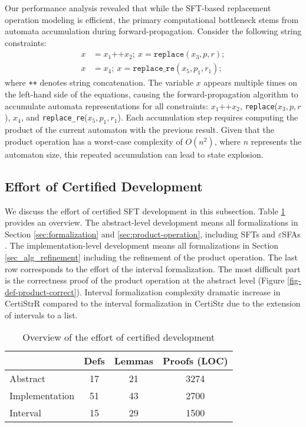 \documentclass[sigplan,10pt,anonymous,review]{acmart}\settopmatter{printfolios=true,printccs=false,printacmref=false}
\begin{document}
Our performance analysis revealed that while the SFT-based replacement operation modeling is efficient, the primary computational bottleneck stems from automata accumulation during  forward-propagation. Consider the following string constraints:
\begin{align}
x &= x_1\texttt{++}x_2;~x = \texttt{replace}(x_3, p, r); \nonumber \\
x &= x_4;~x = \texttt{replace\_re}(x_5, p_1, r_1); \nonumber
\end{align}
where \texttt{++} denotes string concatenation. The variable $x$ appears multiple times on the left-hand side of the equations, causing the forward-propagation algorithm to accumulate automata representations for all constraints: $x_1\texttt{++}x_2$, \texttt{replace}\newline($x_3, p, r$), $x_4$, and \texttt{replace\_re}($x_5, p_1, r_1$). Each accumulation step requires computing the product of the current automaton with the previous result. Given that the product operation has a worst-case complexity of $O(n^2)$, where $n$ represents the automaton size, this repeated accumulation can lead to state explosion.


\subsection{Effort of Certified Development}

We discuss the effort of certified SFT development in this subsection.
Table \ref{tab:abstract_impl} provides an overview. The abstract-level development means all formalizations in Section \ref{sec:formalization} and  \ref{sec:product-operation}, including SFTs and $\varepsilon$SFAs . The implementation-level development means all formalizations in Section \ref{sec_alg_refinement} including the refinement of the product operation. The last row corresponds to the effort of the interval formalization. The most difficult part is the correctness proof of the product operation at the abstract level (Figure \ref{fig-def-product-correct}).
Interval formalization complexity dramatic increase in CertiStrR compared to the interval formalization in CertiStr \cite{cpp/KanLRS22} due to the extension of intervals to a list.

\begin{table}[h]
  \centering
  \small
  \begin{tabular}{lccc}
      \toprule
      & \textbf{Defs} & \textbf{Lemmas} & \textbf{Proofs (LOC)} \\
      \midrule
      Abstract & 17 & 21 & 3274 \\
      Implementation & 51 & 43 & 2700 \\
      Interval & 15 & 29 & 1500 \\
      \bottomrule
  \end{tabular}
  \caption{Overview of the effort of certified development}
  \label{tab:abstract_impl}
\end{table}
\end{document}
